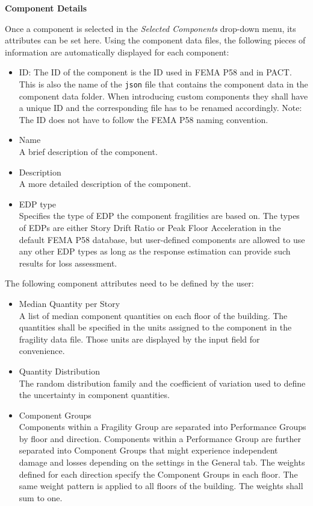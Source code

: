 \vspace{12pt}
\textbf{Component Details}
\vspace{6pt}

Once a component is selected in the \textit{Selected Components} drop-down menu, its attributes can be set here. Using the component data files, the following pieces of information are automatically displayed for each component:

\begin{itemize}
    \item ID: The ID of the component is the ID used in FEMA P58 and in PACT. This is also the name of the \texttt{json} file that contains the component data in the component data folder. When introducing custom components they shall have a unique ID and the corresponding file has to be renamed accordingly.
    Note: The ID does not have to follow the FEMA P58 naming convention.
    \item Name\\
    A brief description of the component.
    \item Description\\
    A more detailed description of the component.
    \item EDP type\\
    Specifies the type of EDP the component fragilities are based on. The types of EDPs are either Story Drift Ratio or Peak Floor Acceleration in the default FEMA P58 database, but user-defined components are allowed to use any other EDP types as long as the response estimation can provide such results for loss assessment.
\end{itemize}

The following component attributes need to be defined by the user:

\begin{itemize}
    \item Median Quantity per Story\\
    A list of median component quantities on each floor of the building. The quantities shall be specified in the units assigned to the component in the fragility data file. Those units are displayed by the input field for convenience.
    \item Quantity Distribution\\
    The random distribution family and the coefficient of variation used to define the uncertainty in component quantities.
    \item Component Groups\\
    Components within a Fragility Group are separated into Performance Groups by floor and direction. Components within a Performance Group are further separated into Component Groups that might experience independent damage and losses depending on the settings in the General tab. The weights defined for each direction specify the Component Groups in each floor. The same weight pattern is applied to all floors of the building. The weights shall sum to one.
\end{itemize}

